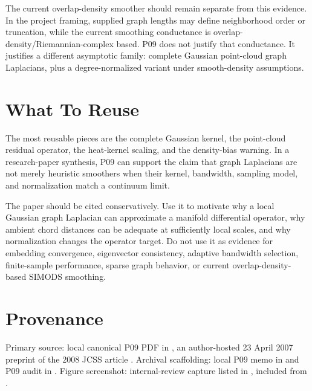 \documentclass[11pt]{article}
\begin{document}
The current  overlap-density smoother should
remain separate from this evidence. In the project framing, supplied graph
lengths may define neighborhood order or truncation, while the current
smoothing conductance is overlap-density/Riemannian-complex based. P09 does
not justify that conductance. It justifies a different asymptotic family:
complete Gaussian point-cloud graph Laplacians, plus a degree-normalized
variant under smooth-density assumptions.

\section{What To Reuse}

The most reusable pieces are the complete Gaussian kernel, the point-cloud
residual operator, the heat-kernel scaling, and the density-bias warning. In a
research-paper synthesis, P09 can support the claim that graph Laplacians are
not merely heuristic smoothers when their kernel, bandwidth, sampling model,
and normalization match a continuum limit.

The paper should be cited conservatively. Use it to motivate why a local
Gaussian graph Laplacian can approximate a manifold differential operator, why
ambient chord distances can be adequate at sufficiently local scales, and why
normalization changes the operator target. Do not use it as evidence for
embedding convergence, eigenvector consistency, adaptive bandwidth selection,
finite-sample performance, sparse graph behavior, or current
overlap-density-based SIMODS smoothing.

\section*{Provenance}

Primary source: local canonical P09 PDF in , an
author-hosted 23 April 2007 preprint of the 2008 JCSS article
\citep{belkin2008towards}. Archival scaffolding: local P09 memo in
 and P09 audit in . Figure screenshot:
internal-review capture listed in , included
from .



\end{document}

